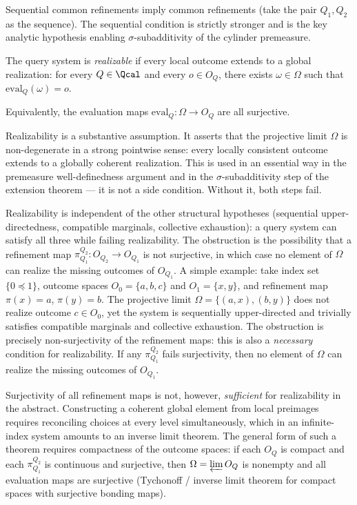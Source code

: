 Sequential common refinements imply common refinements (take the pair $Q_1,Q_2$ as
the sequence).  The sequential condition is strictly stronger and is the key analytic
hypothesis enabling $\sigma$-subadditivity of the cylinder premeasure.

\begin{definition}[Realizability]
\label{def:eval-surjective}
The query system is \emph{realizable} if every local outcome extends to a global
realization: for every $Q\in\Qcal$ and every $o\in O_Q$, there exists
$\omega\in\Omega$ such that $\mathrm{eval}_Q(\omega)=o$.

Equivalently, the evaluation maps $\mathrm{eval}_Q:\Omega\to O_Q$ are all surjective.
\end{definition}

\begin{remark}
Realizability is a substantive assumption. It asserts that the
projective limit $\Omega$ is non-degenerate in a strong pointwise
sense: every locally consistent outcome extends to a globally coherent
realization. This is used in an essential way in the premeasure
well-definedness argument and in the $\sigma$-subadditivity step of
the extension theorem --- it is not a side condition. Without it,
both steps fail.

Realizability is independent of the other structural hypotheses
(sequential upper-directedness, compatible marginals, collective exhaustion):
a query system can satisfy all three while failing realizability.
The obstruction is the possibility that a refinement map
$\pi^{Q_2}_{Q_1} : O_{Q_2} \to O_{Q_1}$ is not surjective, in which case
no element of $\Omega$ can realize the missing outcomes of $O_{Q_1}$.
A simple example: take index set $\{0 \preceq 1\}$, outcome spaces $O_0 = \{a,b,c\}$
and $O_1 = \{x,y\}$, and refinement map $\pi(x) = a$, $\pi(y) = b$.
The projective limit $\Omega = \{(a,x),(b,y)\}$ does not realize outcome $c \in O_0$,
yet the system is sequentially upper-directed and trivially satisfies
compatible marginals and collective exhaustion.
The obstruction is precisely non-surjectivity of the refinement maps: this is also
a \emph{necessary} condition for realizability.  If any $\pi^{Q_2}_{Q_1}$ fails
surjectivity, then no element of $\Omega$ can realize the missing outcomes of $O_{Q_1}$.

Surjectivity of all refinement maps is not, however, \emph{sufficient} for realizability
in the abstract.  Constructing a coherent global element from local preimages requires
reconciling choices at every level simultaneously, which in an infinite-index system
amounts to an inverse limit theorem.  The general form of such a theorem requires
compactness of the outcome spaces: if each $O_Q$ is compact and each
$\pi^{Q_2}_{Q_1}$ is continuous and surjective, then $\Omega = \varprojlim O_Q$ is
nonempty and all evaluation maps are surjective (Tychonoff / inverse limit theorem for
compact spaces with surjective bonding maps).


\end{remark}
